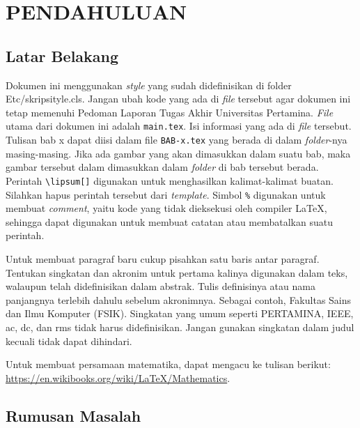 \chapter{PENDAHULUAN}
\label{BAB1:pendahuluan}

\section{Latar Belakang}
 Dokumen ini menggunakan \textit{style} yang sudah didefinisikan di folder Etc/skripsityle.cls. Jangan ubah kode yang ada di \textit{file} tersebut agar dokumen ini tetap memenuhi Pedoman Laporan Tugas Akhir Universitas Pertamina. \textit{File} utama dari dokumen ini adalah \verb|main.tex|. Isi informasi yang ada di \textit{file} tersebut. Tulisan bab x dapat diisi dalam file \verb|BAB-x.tex| yang berada di dalam \textit{folder}-nya masing-masing. Jika ada gambar yang akan dimasukkan dalam suatu bab, maka gambar tersebut dalam dimasukkan dalam \textit{folder} di bab tersebut berada. Perintah \verb|\lipsum[]| digunakan untuk menghasilkan kalimat-kalimat buatan. Silahkan hapus perintah tersebut dari \textit{template}. Simbol \verb|%| digunakan untuk membuat \textit{comment}, yaitu kode yang tidak dieksekusi oleh compiler \LaTeX, sehingga dapat digunakan untuk membuat catatan atau membatalkan suatu perintah.

 Untuk membuat paragraf baru cukup pisahkan satu baris antar paragraf. Tentukan singkatan dan akronim untuk pertama kalinya digunakan dalam teks, walaupun telah didefinisikan dalam abstrak. Tulis definisinya atau nama panjangnya terlebih dahulu sebelum akronimnya. Sebagai contoh, Fakultas Sains dan Ilmu Komputer (FSIK). Singkatan yang umum seperti PERTAMINA, IEEE, ac, dc, dan rms tidak harus didefinisikan. Jangan gunakan singkatan dalam judul kecuali tidak dapat dihindari.

 Untuk membuat persamaan matematika, dapat mengacu ke tulisan berikut: \url{https://en.wikibooks.org/wiki/LaTeX/Mathematics}. 
  
\section{Rumusan Masalah}
\lipsum[7] %

 
